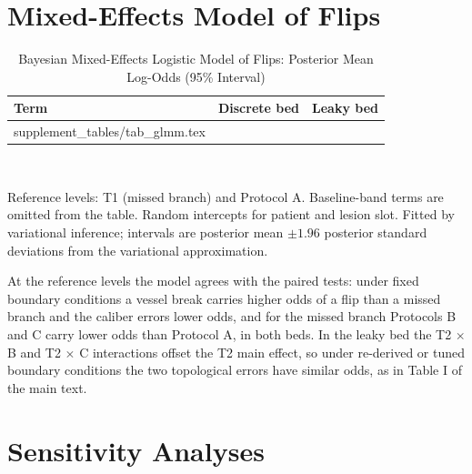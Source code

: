 \documentclass[journal,twoside,web,onecolumn]{ieeecolor}
\begin{document}
\FloatBarrier
\section{Mixed-Effects Model of Flips}
\begin{table}[!ht]
\caption{Bayesian Mixed-Effects Logistic Model of Flips: Posterior Mean Log-Odds (95\% Interval)}\label{tab:glmm}
\centering\small
\begin{tabular}{@{}lcc@{}}
\toprule
Term & Discrete bed & Leaky bed\\
\midrule
{} supplement_tables/tab_glmm.tex 
\bottomrule
\end{tabular}
\\[3pt]
\parbox{0.85\textwidth}{\footnotesize Reference levels: T1 (missed branch) and Protocol A. Baseline-band terms are
omitted from the table. Random intercepts for patient and lesion slot. Fitted by variational inference; intervals are
posterior mean $\pm 1.96$ posterior standard deviations from the variational approximation.}
\end{table}

At the reference levels the model agrees with the paired tests: under fixed boundary conditions a vessel break carries
higher odds of a flip than a missed branch and the caliber errors lower odds, and for the missed branch Protocols B and
C carry lower odds than Protocol A, in both beds. In the leaky bed the T2 $\times$ B and T2 $\times$ C interactions
offset the T2 main effect, so under re-derived or tuned boundary conditions the two topological errors have similar
odds, as in Table I of the main text.

\FloatBarrier
\section{Sensitivity Analyses}
\end{document}
